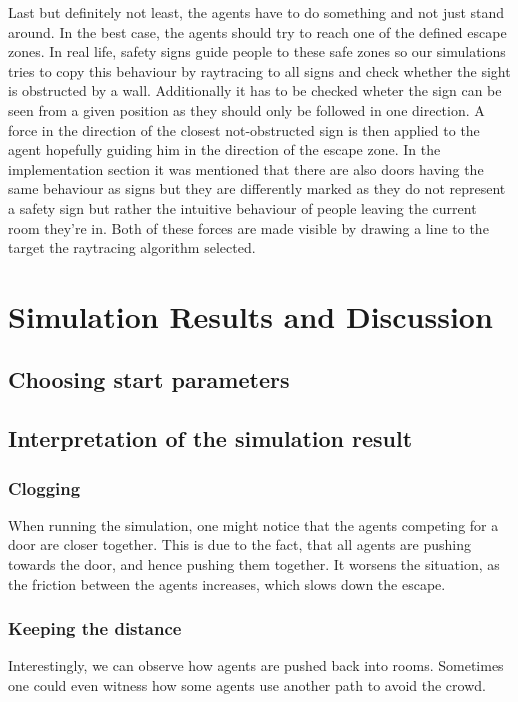 \documentclass[11pt]{article}
\begin{document}
\begin{itemize}
    Last but definitely not least, the agents have to do something and not just stand around. In the best case, the agents should try to reach one of the defined escape zones. In real life, safety signs guide people to these safe zones so our simulations tries to copy this behaviour by raytracing to all signs and check whether the sight is obstructed by a wall. Additionally it has to be checked wheter the sign can be seen from a given position as they should only be followed in one direction. A force in the direction of the closest not-obstructed sign is then applied to the agent hopefully guiding him in the direction of the escape zone. In the implementation section it was mentioned that there are also doors having the same behaviour as signs but they are differently marked as they do not represent a safety sign but rather the intuitive behaviour of people leaving the current room they're in. Both of these forces are made visible by drawing a line to the target the raytracing algorithm selected.
\end{itemize}

\section{Simulation Results and Discussion}

\subsection{Choosing start parameters}

\subsection{Interpretation of the simulation result}

\subsubsection{Clogging}
When running the simulation, one might notice that the agents competing for a door are closer together. This is due to the fact, that all agents are pushing towards the door, and hence pushing them together. It worsens the situation, as the friction between the agents increases, which slows down the escape.  
    
\subsubsection{Keeping the distance}
Interestingly, we can observe how agents are pushed back into rooms. Sometimes one could even witness how some agents use another path to avoid the crowd. 
\end{document}

